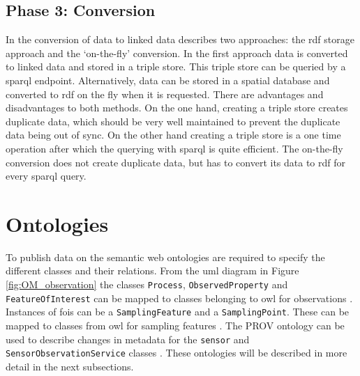 \subsection{Phase 3: Conversion}
In the conversion of data to linked data \cite{LD:Missier} describes two approaches: the \ac{rdf} storage approach and the `on-the-fly' conversion. In the first approach data is converted to linked data and stored in a triple store. This triple store can be queried by a \ac{sparql} endpoint. Alternatively, data can be stored in a spatial database and converted to \ac{rdf} on the fly when it is requested. There are advantages and disadvantages to both methods. On the one hand, creating a triple store creates duplicate data, which should be very well maintained to prevent the duplicate data being out of sync. On the other hand creating a triple store is a one time operation after which the querying with \ac{sparql} is quite efficient. The on-the-fly conversion does not create duplicate data, but has to convert its data to \ac{rdf} for every \ac{sparql} query.

\section{Ontologies}
\label{par:ontologies2}
\begin{sloppypar}
To publish data on the semantic web ontologies are required to specify the different classes and their relations. From the \ac{uml} diagram in Figure \ref{fig:OM_observation} the classes \texttt{Process}, \texttt{ObservedProperty} and \texttt{FeatureOfInterest} can be mapped to classes belonging to \ac{owl} for observations \citep{SSW:Cox}. Instances of \acp{foi} can be a \texttt{SamplingFeature} and a \texttt{SamplingPoint}. These can be mapped to classes from \ac{owl} for sampling features \citep{SSW:Cox2}. The PROV ontology can be used to describe changes in metadata for the \texttt{sensor} and \texttt{SensorObservationService} classes \citep{LD:W3C2}. These ontologies will be described in more detail in the next subsections.
\end{sloppypar}

